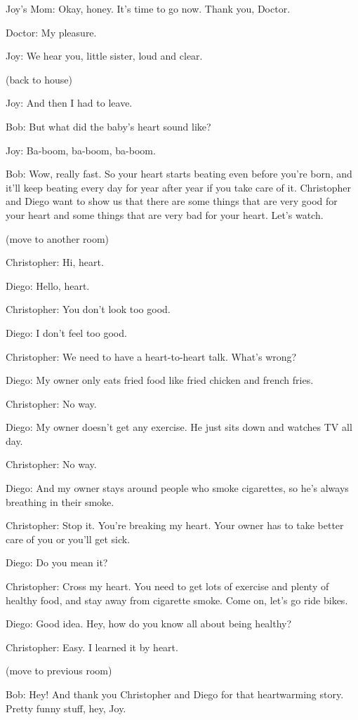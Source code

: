 Joy's Mom: Okay, honey. It's time to go now. Thank you, Doctor.

Doctor: My pleasure.

Joy: We hear you, little sister, loud and clear.

(back to house)

Joy: And then I had to leave.

Bob: But what did the baby's heart sound like?

Joy: Ba-boom, ba-boom, ba-boom.

Bob: Wow, really fast. So your heart starts beating even before you're born, and it'll keep beating every day for year after year if you take care of it. Christopher and Diego want to show us that there are some things that are very good for your heart and some things that are very bad for your heart. Let's watch.

(move to another room)

Christopher: Hi, heart.

Diego: Hello, heart.

Christopher: You don't look too good.

Diego: I don't feel too good.

Christopher: We need to have a heart-to-heart talk. What's wrong?

Diego: My owner only eats fried food like fried chicken and french fries.

Christopher: No way.

Diego: My owner doesn't get any exercise. He just sits down and watches TV all day.

Christopher: No way.

Diego: And my owner stays around people who smoke cigarettes, so he's always breathing in their smoke.

Christopher: Stop it. You're breaking my heart. Your owner has to take better care of you or you'll get sick.

Diego: Do you mean it?

Christopher: Cross my heart. You need to get lots of exercise and plenty of healthy food, and stay away from cigarette smoke. Come on, let's go ride bikes.

Diego: Good idea. Hey, how do you know all about being healthy?

Christopher: Easy. I learned it by heart.

(move to previous room)

Bob: Hey! And thank you Christopher and Diego for that heartwarming story. Pretty funny stuff, hey, Joy.

